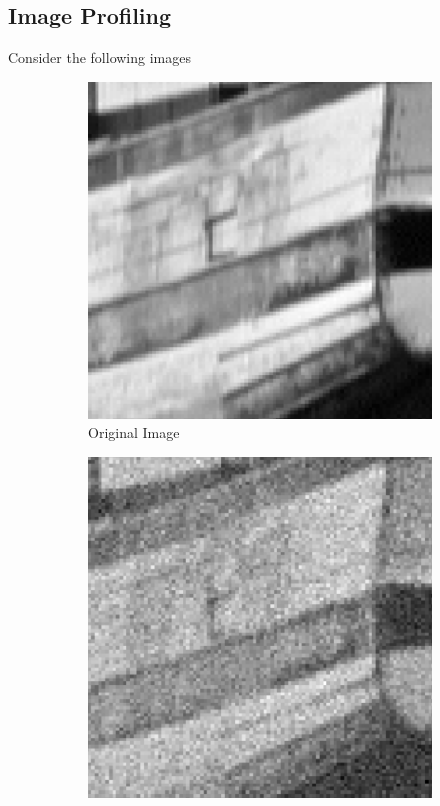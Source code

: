 \documentclass{article}
\begin{document}
  \subsection{Image Profiling}
  Consider the following images
  \begin{figure}[!htb]
    \begin{center}
      \begin{subfigure}[b]{0.4\textwidth}
        \includegraphics[width=\textwidth]{../report_images/boat_crop.png}
        \caption{Original Image}
      \end{subfigure}
      \hfill
      \begin{subfigure}[b]{0.4\textwidth}
        \includegraphics[width=\textwidth]{../report_images/noisy.png}

\end{subfigure}
\end{center}
\end{figure}
\end{document}
